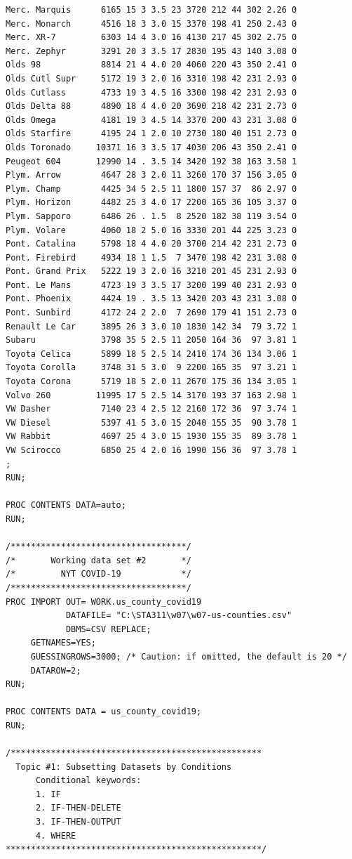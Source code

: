 \documentclass[
]{book}
\begin{document}
\begin{verbatim}
Merc. Marquis      6165 15 3 3.5 23 3720 212 44 302 2.26 0
Merc. Monarch      4516 18 3 3.0 15 3370 198 41 250 2.43 0
Merc. XR-7         6303 14 4 3.0 16 4130 217 45 302 2.75 0
Merc. Zephyr       3291 20 3 3.5 17 2830 195 43 140 3.08 0
Olds 98            8814 21 4 4.0 20 4060 220 43 350 2.41 0
Olds Cutl Supr     5172 19 3 2.0 16 3310 198 42 231 2.93 0
Olds Cutlass       4733 19 3 4.5 16 3300 198 42 231 2.93 0
Olds Delta 88      4890 18 4 4.0 20 3690 218 42 231 2.73 0
Olds Omega         4181 19 3 4.5 14 3370 200 43 231 3.08 0
Olds Starfire      4195 24 1 2.0 10 2730 180 40 151 2.73 0
Olds Toronado     10371 16 3 3.5 17 4030 206 43 350 2.41 0
Peugeot 604       12990 14 . 3.5 14 3420 192 38 163 3.58 1
Plym. Arrow        4647 28 3 2.0 11 3260 170 37 156 3.05 0
Plym. Champ        4425 34 5 2.5 11 1800 157 37  86 2.97 0
Plym. Horizon      4482 25 3 4.0 17 2200 165 36 105 3.37 0
Plym. Sapporo      6486 26 . 1.5  8 2520 182 38 119 3.54 0
Plym. Volare       4060 18 2 5.0 16 3330 201 44 225 3.23 0
Pont. Catalina     5798 18 4 4.0 20 3700 214 42 231 2.73 0
Pont. Firebird     4934 18 1 1.5  7 3470 198 42 231 3.08 0
Pont. Grand Prix   5222 19 3 2.0 16 3210 201 45 231 2.93 0
Pont. Le Mans      4723 19 3 3.5 17 3200 199 40 231 2.93 0
Pont. Phoenix      4424 19 . 3.5 13 3420 203 43 231 3.08 0
Pont. Sunbird      4172 24 2 2.0  7 2690 179 41 151 2.73 0
Renault Le Car     3895 26 3 3.0 10 1830 142 34  79 3.72 1
Subaru             3798 35 5 2.5 11 2050 164 36  97 3.81 1
Toyota Celica      5899 18 5 2.5 14 2410 174 36 134 3.06 1
Toyota Corolla     3748 31 5 3.0  9 2200 165 35  97 3.21 1
Toyota Corona      5719 18 5 2.0 11 2670 175 36 134 3.05 1
Volvo 260         11995 17 5 2.5 14 3170 193 37 163 2.98 1
VW Dasher          7140 23 4 2.5 12 2160 172 36  97 3.74 1
VW Diesel          5397 41 5 3.0 15 2040 155 35  90 3.78 1
VW Rabbit          4697 25 4 3.0 15 1930 155 35  89 3.78 1
VW Scirocco        6850 25 4 2.0 16 1990 156 36  97 3.78 1
;
RUN;

PROC CONTENTS DATA=auto;
RUN;

/***********************************/
/*       Working data set #2       */
/*         NYT COVID-19            */
/***********************************/
PROC IMPORT OUT= WORK.us_county_covid19 
            DATAFILE= "C:\STA311\w07\w07-us-counties.csv" 
            DBMS=CSV REPLACE;
     GETNAMES=YES;
     GUESSINGROWS=3000; /* Caution: if omitted, the default is 20 */
     DATAROW=2; 
RUN;

PROC CONTENTS DATA = us_county_covid19;
RUN;

/**************************************************
  Topic #1: Subsetting Datasets by Conditions
      Conditional keywords:
      1. IF
      2. IF-THEN-DELETE
      3. IF-THEN-OUTPUT 
      4. WHERE
***************************************************/


\end{verbatim}
\end{document}
